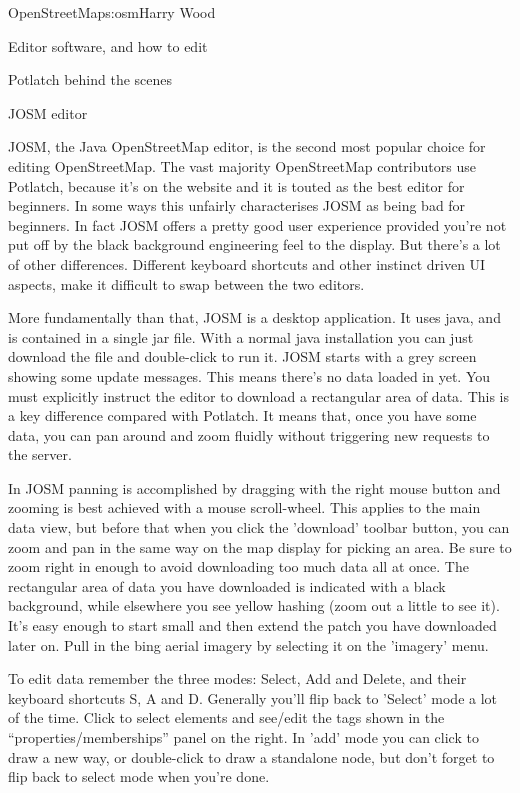\begin{aosachapter}{OpenStreetMap}{s:osm}{Harry Wood}
\begin{aosasect1}{Editor software, and how to edit}
\begin{aosasect2}{Potlatch behind the scenes}
\end{aosasect2}

\begin{aosasect2}{JOSM editor}

JOSM, the Java OpenStreetMap editor, is the second most popular choice
for editing OpenStreetMap. The vast majority OpenStreetMap
contributors use Potlatch, because it's on the website and it is
touted as the best editor for beginners. In some ways this unfairly
characterises JOSM as being bad for beginners. In fact JOSM offers a
pretty good user experience provided you're not put off by the black
background engineering feel to the display. But there's a lot of other
differences. Different keyboard shortcuts and other instinct driven UI
aspects, make it difficult to swap between the two editors.

More fundamentally than that, JOSM is a desktop application. It uses
java, and is contained in a single jar file. With a normal java
installation you can just download the file and double-click to run
it. JOSM starts with a grey screen showing some update messages. This
means there's no data loaded in yet. You must explicitly instruct the
editor to download a rectangular area of data. This is a key
difference compared with Potlatch. It means that, once you have some
data, you can pan around and zoom fluidly without triggering new
requests to the server.

In JOSM panning is accomplished by dragging with the right mouse
button and zooming is best achieved with a mouse scroll-wheel. This
applies to the main data view, but before that when you click the
'download' toolbar button, you can zoom and pan in the same way on the
map display for picking an area. Be sure to zoom right in enough to
avoid downloading too much data all at once. The rectangular area of
data you have downloaded is indicated with a black background, while
elsewhere you see yellow hashing (zoom out a little to see it). It's
easy enough to start small and then extend the patch you have
downloaded later on. Pull in the bing aerial imagery by selecting it
on the 'imagery' menu.

To edit data remember the three modes: Select, Add and Delete, and
their keyboard shortcuts S, A and D. Generally you'll flip back to
'Select' mode a lot of the time. Click to select elements and see/edit
the tags shown in the ``properties/memberships'' panel on the
right. In 'add' mode you can click to draw a new way, or double-click
to draw a standalone node, but don't forget to flip back to select
mode when you're done.


\end{aosasect2}
\end{aosasect1}
\end{aosachapter}
